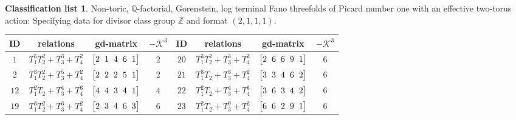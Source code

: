 \documentclass[pdftex]{sigma}%
\theoremstyle{definition}
\newtheorem{class-list}[thm]{Classification list}
\def\ZZ{{\mathbb Z}}
\def\QQ{{\mathbb Q}}
\numberwithin{equation}{section}
\begin{document}
\begin{class-list}
Non-toric, $\QQ$-factorial, Gorenstein, log terminal Fano
threefolds of Picard number one with an effective two-torus action:
Specifying data for divisor class group $\ZZ$ and format $(2,1,1,1)$.
\begin{table}[h!]\centering\setlength{\tabcolsep}{3.5pt}
\renewcommand{\arraystretch}{1.3}\small\tabulinesep=1mm
\begin{tabu}{c|c|c|c||c|c|c|c}
\hline
ID&relations&gd-matrix&$-\mathcal{K}^3$&ID&relations&gd-matrix&$-\mathcal{K}^3$
\\
\hline
${1}$&${T_{1}^{5}T_{2}^{2}+T_{3}^{3}+T_{4}^{2}}$
&$\arraycolsep=1mm\begin{bmatrix}{2} & {1} & {4} & {6} & {1}\end{bmatrix}$&${2}$
&${20}$&${T_{1}^{3}T_{2}^{2}+T_{3}^{3}+T_{4}^{2}}$
&$\arraycolsep=1mm\begin{bmatrix}{2} & {6} & {6} & {9} & {1}\end{bmatrix}$&${6}$
\\
\hline
${2}$&${T_{1}^{3}T_{2}^{2}+T_{3}^{5}+T_{4}^{2}}$
&$\arraycolsep=1mm\begin{bmatrix}{2} & {2} & {2} & {5} & {1}\end{bmatrix}$&${2}$
&${21}$&${T_{1}^{3}T_{2}+T_{3}^{3}+T_{4}^{2}}$
&$\arraycolsep=1mm\begin{bmatrix}{3} & {3} & {4} & {6} & {2}\end{bmatrix}$&${6}$
\\
\hline
${12}$&${T_{1}^{2}T_{2}+T_{3}^{4}+T_{4}^{3}}$
&$\arraycolsep=1mm\begin{bmatrix}{4} & {4} & {3} & {4} & {1}\end{bmatrix}$&${4}$
&${22}$&${T_{1}^{2}T_{2}+T_{3}^{4}+T_{4}^{3}}$
&$\arraycolsep=1mm\begin{bmatrix}{3} & {6} & {3} & {4} & {2}\end{bmatrix}$&${6}$
\\
\hline
${19}$&${T_{1}^{3}T_{2}^{2}+T_{3}^{3}+T_{4}^{2}}$
&$\arraycolsep=1mm\begin{bmatrix}{2} & {3} & {4} & {6} & {3}\end{bmatrix}$&${6}$
&${23}$&${T_{1}^{2}T_{2}+T_{3}^{9}+T_{4}^{2}}$
&$\arraycolsep=1mm\begin{bmatrix}{6} & {6} & {2} & {9} & {1}\end{bmatrix}$&${6}$
\\
\hline
\end{tabu}\vspace{-2mm}
\end{table}



\end{class-list}
\end{document}
